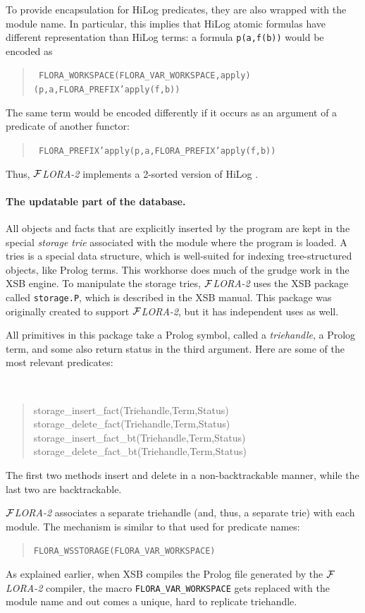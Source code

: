 \documentclass[11pt]{article}
\newcommand{\FLORA}{{\mbox{${\cal F}${\small\it LORA}\rm\emph{-2}}}\xspace}
\begin{document}
To provide encapsulation for HiLog predicates, they are also wrapped with
the module name. In particular, this implies that HiLog atomic formulas
have different representation than HiLog terms: a formula {\tt p(a,f(b))}
would be encoded as
\begin{quote}
 \tt
 FLORA\_WORKSPACE(FLORA\_VAR\_WORKSPACE,apply)(p,a,FLORA\_PREFIX'apply(f,b))  
\end{quote}
The same term would be encoded differently if it occurs as an argument of a
predicate of another functor:
\begin{quote}
 \tt
 FLORA\_PREFIX'apply(p,a,FLORA\_PREFIX'apply(f,b))    
\end{quote}
Thus, \FLORA implements a 2-sorted version of HiLog \cite{hilog-icdt-95}.

\paragraph{The updatable part of the database.}
All objects and facts that are explicitly inserted by the program are kept
in the special \emph{storage trie} associated with the module where the
program is loaded. A tries is a special data structure, which is
well-suited for indexing tree-structured objects, like Prolog terms. This
workhorse does much of the grudge work in the XSB engine. To manipulate the
storage tries, \FLORA uses the XSB package called {\tt storage.P}, which is
described in the XSB manual. This package was originally created to support
\FLORA, but it has independent uses as well.

All primitives in this package take a Prolog symbol, called a
\emph{triehandle}, a Prolog term, and some also return status in the third
argument. Here are some of the most relevant predicates:
{\tt
\begin{quote}
  storage\_insert\_fact(Triehandle,Term,Status)\\
  storage\_delete\_fact(Triehandle,Term,Status)\\
  storage\_insert\_fact\_bt(Triehandle,Term,Status)\\
  storage\_delete\_fact\_bt(Triehandle,Term,Status)
\end{quote}
}
\noindent
The first two methods insert and delete in a non-backtrackable manner,
while the last two are backtrackable.

\FLORA associates a separate triehandle (and, thus, a separate trie) with
each module. The mechanism is similar to that used for predicate names:
\begin{quote}
 \tt FLORA\_WSSTORAGE(FLORA\_VAR\_WORKSPACE)  
\end{quote}
As explained earlier, when XSB compiles the Prolog file generated by the
\FLORA compiler, the macro {\tt FLORA\_VAR\_WORKSPACE} gets replaced with
the module name and out comes a unique, hard to replicate triehandle.
\end{document}
